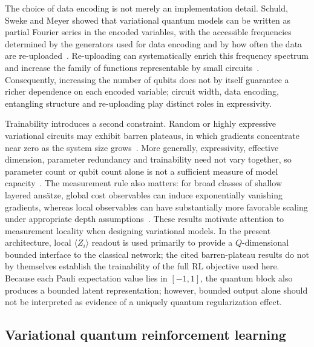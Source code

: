 \documentclass[aps,floatfix,superscriptaddress,twocolumn,tightenlines,amsmath,amssymb,nofootinbib,10pt,longbibliography,prl]{revtex4-2}
\begin{document}
The choice of data encoding is not merely an implementation detail. Schuld, Sweke and Meyer showed that variational quantum models can be written as partial Fourier series in the encoded variables, with the accessible frequencies determined by the generators used for data encoding and by how often the data are re-uploaded~\cite{Schuld2021Effectofdataencodi}. Re-uploading can systematically enrich this frequency spectrum and increase the family of functions representable by small circuits~\cite{PrezSalinas2020Datareuploadingfor}. Consequently, increasing the number of qubits does not by itself guarantee a richer dependence on each encoded variable; circuit width, data encoding, entangling structure and re-uploading play distinct roles in expressivity.

Trainability introduces a second constraint. Random or highly expressive variational circuits may exhibit barren plateaus, in which gradients concentrate near zero as the system size grows~\cite{McClean2018Barrenplateausinqu,Holmes2022ConnectingAnsatzEx}. More generally, expressivity, effective dimension, parameter redundancy and trainability need not vary together, so parameter count or qubit count alone is not a sufficient measure of model capacity~\cite{Haug2021CapacityQuantumGeometry}. The measurement rule also matters: for broad classes of shallow layered ans\"atze, global cost observables can induce exponentially vanishing gradients, whereas local observables can have substantially more favorable scaling under appropriate depth assumptions~\cite{Cerezo2021Costfunctiondepend}. These results motivate attention to measurement locality when designing variational models. In the present architecture, local $\langle Z_i\rangle$ readout is used primarily to provide a $Q$-dimensional bounded interface to the classical network; the cited barren-plateau results do not by themselves establish the trainability of the full RL objective used here. Because each Pauli expectation value lies in $[-1,1]$, the quantum block also produces a bounded latent representation; however, bounded output alone should not be interpreted as evidence of a uniquely quantum regularization effect.

\subsection{Variational quantum reinforcement learning}
\label{subsec:bg-qrl}
\end{document}
